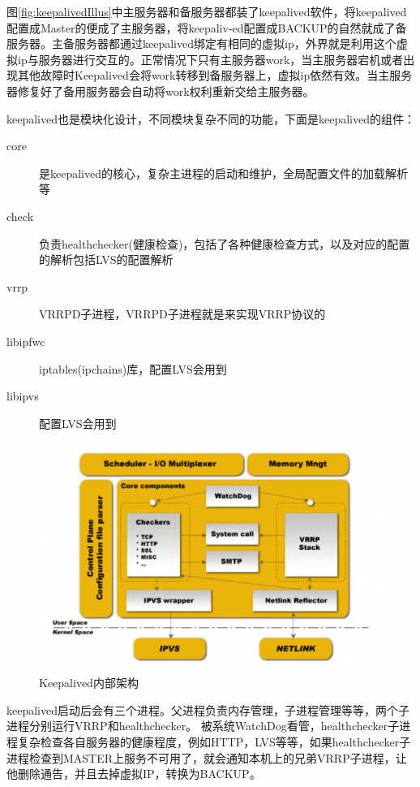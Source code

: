 图\ref{fig:keepalivedIllus}中主服务器和备服务器都装了keepalived软件，将keepalived配置成Master的便成了主服务器，将keepaliv-ed配置成BACKUP的自然就成了备服务器。主备服务器都通过keepalived绑定有相同的虚拟ip，外界就是利用这个虚拟ip与服务器进行交互的。正常情况下只有主服务器work，当主服务器宕机或者出现其他故障时Keepalived会将work转移到备服务器上，虚拟ip依然有效。当主服务器修复好了备用服务器会自动将work权利重新交给主服务器。 

keepalived也是模块化设计，不同模块复杂不同的功能，下面是keepalived的组件：

\begin{description}
\item[core]是keepalived的核心，复杂主进程的启动和维护，全局配置文件的加载解析等
\item[check]负责healthchecker(健康检查)，包括了各种健康检查方式，以及对应的配置的解析包括LVS的配置解析
\item[vrrp]VRRPD子进程，VRRPD子进程就是来实现VRRP协议的
\item[libipfwc]iptables(ipchains)库，配置LVS会用到
\item[libipvs]配置LVS会用到
\end{description}

\begin{figure}[ht]
	\begin{center}
		\includegraphics[keepaspectratio,width=0.5\paperwidth]{Pictures/Network/KeepalivedCore.png}
	\caption{Keepalived内部架构}
	\label{fig:KeepalivedCore}
	\end{center}
\end{figure}

keepalived启动后会有三个进程。父进程负责内存管理，子进程管理等等，两个子进程分别运行VRRP和healthchecker。
被系统WatchDog看管，healthchecker子进程复杂检查各自服务器的健康程度，例如HTTP，LVS等等，如果healthchecker子进程检查到MASTER上服务不可用了，就会通知本机上的兄弟VRRP子进程，让他删除通告，并且去掉虚拟IP，转换为BACKUP。

